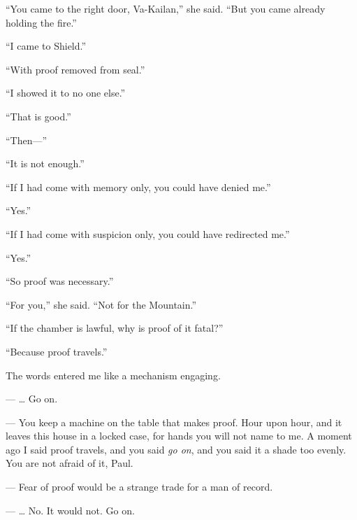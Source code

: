 ``You came to the right door, Va-Kailan,'' she said. ``But you came already holding the fire.''\par

``I came to Shield.''\par

``With proof removed from seal.''\par

``I showed it to no one else.''\par

``That is good.''\par

``Then---''\par

``It is not enough.''\par

``If I had come with memory only, you could have denied me.''\par

``Yes.''\par

``If I had come with suspicion only, you could have redirected me.''\par

``Yes.''\par

``So proof was necessary.''\par

``For you,'' she said. ``Not for the Mountain.''\par

``If the chamber is lawful, why is proof of it fatal?''\par

``Because proof travels.''\par

The words entered me like a mechanism engaging.\par

\ornament

\begin{room}

--- \ldots{} Go on.

--- You keep a machine on the table that makes proof. Hour upon hour, and it leaves this house in a locked case, for hands you will not name to me. A moment ago I said proof travels, and you said \emph{go on}, and you said it a shade too evenly. You are not afraid of it, Paul.

--- Fear of proof would be a strange trade for a man of record.

--- \ldots{} No. It would not. Go on.

\end{room}

